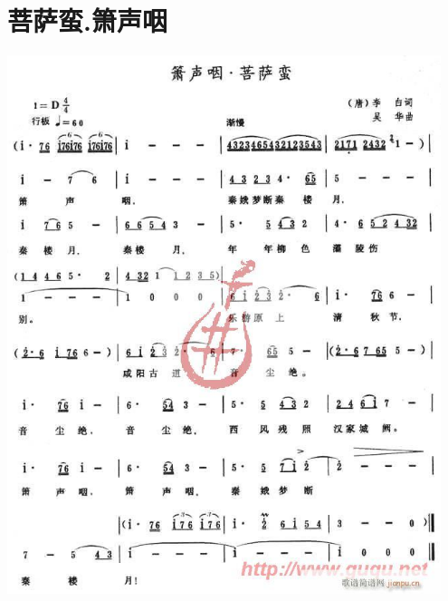 \documentclass[cn,pad,twocol]{elegantbook}
\begin{document}
\section{菩萨蛮.箫声咽}\includegraphics[width=0.95\textwidth]{dongxiao/20200909-箫声咽-菩萨蛮.jpg}
\end{document}
